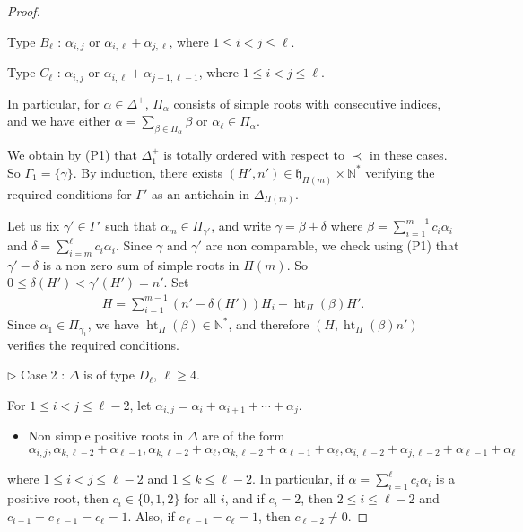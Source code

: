 \documentclass[10pt,a4paper]{amsart}
\newcommand{\height}{\mathop{\mathrm{ht}}\nolimits}
\numberwithin{equation}{section}
\theoremstyle{plain}
\theoremstyle{definition}
\theoremstyle{remark}
\begin{document}
\begin{proof}
\begin{itemize}
Type $B_{\ell}$ : $\alpha_{i,j}$ or $\alpha_{i,\ell} + \alpha_{j,\ell}$, where 
$1 \leqslant i < j \leqslant \ell$.

Type $C_{\ell}$ : $\alpha_{i,j}$ or $\alpha_{i,\ell} + \alpha_{j-1,\ell-1}$,
where $1 \leqslant i < j \leqslant \ell$.

\noindent In particular, for $\alpha\in\Delta^{+}$, $\Pi_{\alpha}$ consists of simple roots with 
consecutive indices, and we have either
$\alpha = \sum_{\beta\in \Pi_{\alpha}} \beta$ or 
$\alpha_{\ell} \in \Pi_{\alpha}$.
\end{itemize}

We obtain by (P1) that $\Delta_{1}^{+}$ is totally ordered with respect to $\prec$ in these cases.
So $\Gamma_{1} = \{ \gamma \}$. 
By induction, there exists $( H' , n' ) \in\mathfrak{h}_{\Pi (m)} \times \mathbb{N}^{*}$ 
verifying the required conditions for $\Gamma'$ as an antichain in $\Delta_{\Pi (m) }$.

Let us fix $\gamma'\in \Gamma'$ such that $\alpha_{m}\in\Pi_{\gamma'}$, and
write $\gamma = \beta + \delta$ where 
$\beta = \sum_{i=1}^{m-1} c_{i}\alpha_{i}$ and 
$\delta = \sum_{i=m}^{\ell} c_{i}\alpha_{i}$.
Since $\gamma$ and $\gamma'$ are non comparable, we check using (P1)
that $\gamma' - \delta$ is a non zero sum of simple roots in $\Pi (m)$. So
$0 \leqslant  \delta (H')  < \gamma'  (H') = n'$. 
Set 
$$\begin{array}{c}
H = \sum\limits_{i=1}^{m-1} (n' - \delta( H') ) H_{i} + \height_{\Pi} (\beta) H'.
\end{array}$$
Since $\alpha_{1}\in \Pi_{\gamma_{1}}$, we have $\height_{\Pi} (\beta ) \in \mathbb{N}^{*}$,
and therefore $(H , \height_{\Pi}(\beta ) n' )$ verifies the required conditions.
\smallskip

\noindent$\triangleright$ Case 2 : $\Delta$ is of type $D_{\ell}$, $\ell \geqslant 4$.
\smallskip

For $1\leqslant i < j \leqslant \ell-2$, let 
$\alpha_{i,j} = \alpha_{i} + \alpha_{i+1} + \cdots + \alpha_{j}$.

\begin{itemize}
\item[(P2)] 
Non simple positive roots in $\Delta$ are of the form 
$$
\alpha_{i,j}, \alpha_{k,\ell-2} + \alpha_{\ell-1},  \alpha_{k,\ell-2} + \alpha_{\ell},
\alpha_{k,\ell-2} + \alpha_{\ell-1} + \alpha_{\ell}, \alpha_{i,\ell-2} + \alpha_{j,\ell -2} + 
\alpha_{\ell-1} + \alpha_{\ell} 
$$
\end{itemize}
\noindent where $1\leqslant i < j \leqslant \ell-2$ and $1\leqslant k \leqslant \ell-2$. In particular, if
$\alpha = \sum_{i=1}^{\ell} c_{i} \alpha_{i}$ is a positive root, then 
$c_{i} \in \{ 0, 1,2 \}$ for all $i$, and if $c_{i} = 2$, then $2\leqslant i\leqslant \ell-2$ and
$c_{i-1} = c_{\ell-1} = c_{\ell} = 1$. Also, if $c_{\ell-1} = c_{\ell} = 1$, then $c_{\ell-2}\neq 0$.
\smallskip


\end{proof}
\end{document}
